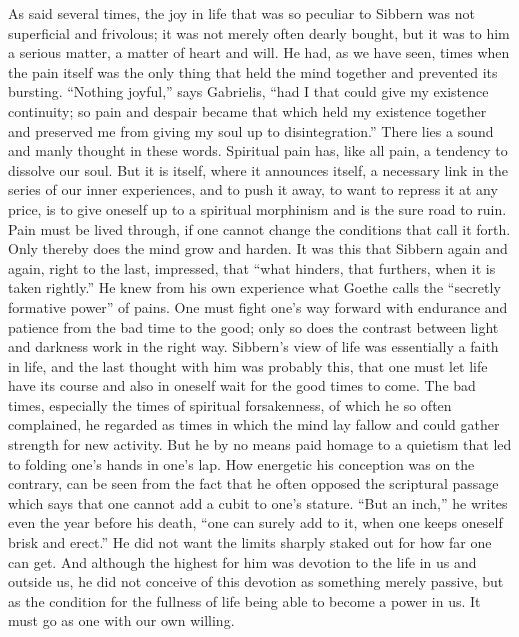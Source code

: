 \documentclass[12pt,a4paper,openany]{book}
\newcommand{\opage}[1]{\marginnote{\footnotesize\textit{[#1]}}}
\begin{document}
As said several times, the joy in life that was so
peculiar to Sibbern was not superficial and frivolous; it was
not merely often dearly bought, but it was to him a serious matter,
a matter of heart and will. He had, as we have seen,
times when the pain itself was the only thing that held the mind
together and prevented its bursting. ``Nothing joyful,''
says Gabrielis, ``had I that could give my existence
continuity; so pain and despair became that which
held my existence together and preserved me from giving
my soul up to disintegration.'' There lies a sound and
manly thought in these words. Spiritual pain has, like
all pain, a tendency to dissolve our soul. But it
is itself, where it announces itself, a necessary link in
the series of our inner experiences, and to push it away, to
want to repress it at any price, is to give oneself up
to a spiritual morphinism and is the sure road to
ruin. Pain must be lived through, if one cannot
change the conditions that call it forth. Only thereby does the mind grow
and harden. It was this that Sibbern again and again, right
to the last, impressed, that ``what hinders, that
furthers, when it is taken rightly.'' He knew from his own experience
what Goethe calls the ``secretly formative power'' of pains.
One must fight one's way forward with endurance and
\opage{71}patience from the bad time to the good; only so does the
contrast between light and darkness work in the right way. Sibbern's
view of life was essentially a faith in life, and the last
thought with him was probably this, that one must let life have
its course and also in oneself wait for the good times
to come. The bad times, especially the times of spiritual forsakenness, of which
he so often complained, he regarded as times in which
the mind lay fallow and could gather strength for new activity.
But he by no means paid homage to a quietism that led to
folding one's hands in one's lap. How energetic his
conception was on the contrary, can be seen from the fact that he often opposed
the scriptural passage which says that one cannot add a
cubit to one's stature. ``But an inch,'' he writes even
the year before his death, ``one can surely add to it, when one
keeps oneself brisk and erect.'' He did not want the limits
sharply staked out for how far one can get. And although the
highest for him was devotion to the life in us and outside
us, he did not conceive of this devotion as something merely
passive, but as the condition for the fullness of life being able to become
a power in us. It must go as one with our own willing.
\end{document}
